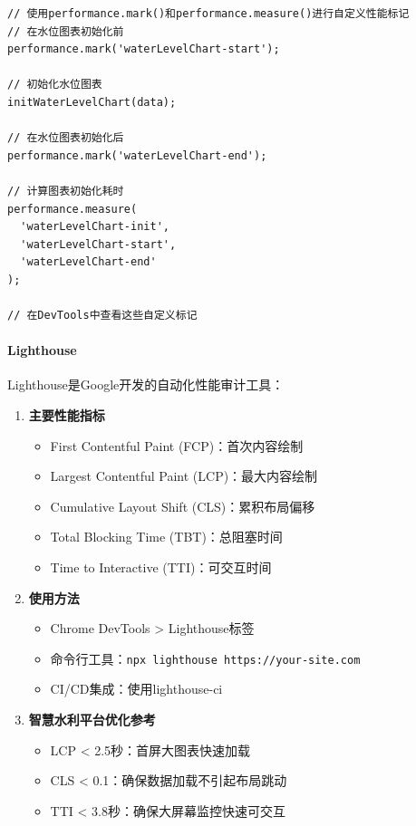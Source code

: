 \begin{lstlisting}
// 使用performance.mark()和performance.measure()进行自定义性能标记
// 在水位图表初始化前
performance.mark('waterLevelChart-start');

// 初始化水位图表
initWaterLevelChart(data);

// 在水位图表初始化后
performance.mark('waterLevelChart-end');

// 计算图表初始化耗时
performance.measure(
  'waterLevelChart-init', 
  'waterLevelChart-start', 
  'waterLevelChart-end'
);

// 在DevTools中查看这些自定义标记
\end{lstlisting}

\paragraph{Lighthouse}\label{lighthouse}

Lighthouse是Google开发的自动化性能审计工具：

\begin{enumerate}
\def\labelenumi{\arabic{enumi}.}
\tightlist
\item
  \textbf{主要性能指标}

  \begin{itemize}
  \tightlist
  \item
    First Contentful Paint (FCP)：首次内容绘制
  \item
    Largest Contentful Paint (LCP)：最大内容绘制
  \item
    Cumulative Layout Shift (CLS)：累积布局偏移
  \item
    Total Blocking Time (TBT)：总阻塞时间
  \item
    Time to Interactive (TTI)：可交互时间
  \end{itemize}
\item
  \textbf{使用方法}

  \begin{itemize}
  \tightlist
  \item
    Chrome DevTools \textgreater{} Lighthouse标签
  \item
    命令行工具：\passthrough{\lstinline!npx lighthouse https://your-site.com!}
  \item
    CI/CD集成：使用lighthouse-ci
  \end{itemize}
\item
  \textbf{智慧水利平台优化参考}

  \begin{itemize}
  \tightlist
  \item
    LCP \textless{} 2.5秒：首屏大图表快速加载
  \item
    CLS \textless{} 0.1：确保数据加载不引起布局跳动
  \item
    TTI \textless{} 3.8秒：确保大屏幕监控快速可交互
  \end{itemize}
\end{enumerate}

